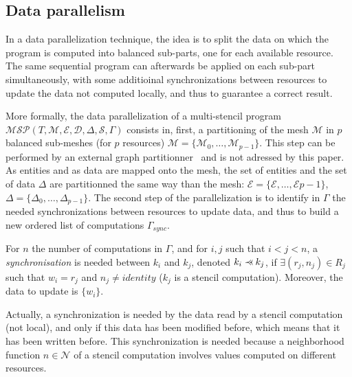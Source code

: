 
\subsection{Data parallelism}
\label{sect:dataparal}
In a data parallelization technique, the idea is to split the data on which the program is computed into balanced sub-parts, one for each available resource. The same sequential program can afterwards be applied on each sub-part simultaneously, with some additioinal synchronizations between resources to update the data not computed locally, and thus to guarantee a correct result.

More formally, the data parallelization of a multi-stencil program $\mathcal{MSP}(T,\mathcal{M},\mathcal{E},\mathcal{D},\Delta, \mathcal{S},\Gamma)$ consists in, first, a partitioning of the mesh $\mathcal{M}$ in $p$ balanced sub-meshes (for $p$ resources) $\mathcal{M}=\{\mathcal{M}_0,\dots,\mathcal{M}_{p-1}\}$. This step can be performed by an external graph partitionner~\cite{} and is not adressed by this paper. As entities and as data are mapped onto the mesh, the set of entities and the set of data $\Delta$ are partitionned the same way than the mesh: $\mathcal{E}=\{\mathcal{E},\dots,\mathcal{E}{p-1}\}$, $\Delta=\{\Delta_0,\dots,\Delta_{p-1}\}$. The second step of the parallelization is to identify in $\Gamma$ the needed synchronizations between resources to update data, and thus to build a new ordered list of computations $\Gamma_{sync}$.

\begin{mydef}
For $n$ the number of computations in $\Gamma$, and for $i,j$ such that $i<j<n$, a \textit{synchronisation} is needed between $k_i$ and $k_j$, denoted $k_i \pprec k_j$, if $\exists (r_j,n_j) \in R_j$ such that $w_i=r_j$ and $n_j\neq identity$ ($k_j$ is a stencil computation). Moreover, the data to update is $\{w_i\}$.
\end{mydef}

Actually, a synchronization is needed by the data read by a stencil computation (not local), and only if this data has been modified before, which means that it has been written before. This synchronization is needed because a neighborhood function $n \in \mathcal{N}$ of a stencil computation involves values computed on different resources.

